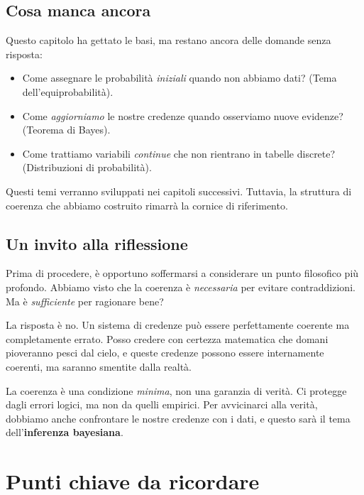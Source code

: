 \documentclass[
  italian,
  letterpaper,
  a4paper,
  11pt,
  open=any]{scrbook}
\providecommand{\tightlist}{%
  \setlength{\itemsep}{0pt}\setlength{\parskip}{0pt}}
\theoremstyle{plain}
\theoremstyle{definition}
\theoremstyle{definition}
\theoremstyle{remark}
\begin{document}
\subsection{Cosa manca ancora}\label{cosa-manca-ancora}

Questo capitolo ha gettato le basi, ma restano ancora delle domande
senza risposta:

\begin{itemize}
\tightlist
\item
  Come assegnare le probabilità \emph{iniziali} quando non abbiamo dati?
  (Tema dell'equiprobabilità).
\item
  Come \emph{aggiorniamo} le nostre credenze quando osserviamo nuove
  evidenze? (Teorema di Bayes).
\item
  Come trattiamo variabili \emph{continue} che non rientrano in tabelle
  discrete? (Distribuzioni di probabilità).
\end{itemize}

Questi temi verranno sviluppati nei capitoli successivi. Tuttavia, la
struttura di coerenza che abbiamo costruito rimarrà la cornice di
riferimento.

\subsection{Un invito alla
riflessione}\label{un-invito-alla-riflessione}

Prima di procedere, è opportuno soffermarsi a considerare un punto
filosofico più profondo. Abbiamo visto che la coerenza è
\emph{necessaria} per evitare contraddizioni. Ma è \emph{sufficiente}
per ragionare bene?

La risposta è no. Un sistema di credenze può essere perfettamente
coerente ma completamente errato. Posso credere con certezza matematica
che domani pioveranno pesci dal cielo, e queste credenze possono essere
internamente coerenti, ma saranno smentite dalla realtà.

La coerenza è una condizione \emph{minima}, non una garanzia di verità.
Ci protegge dagli errori logici, ma non da quelli empirici. Per
avvicinarci alla verità, dobbiamo anche confrontare le nostre credenze
con i dati, e questo sarà il tema dell'\textbf{inferenza bayesiana}.

\section*{Punti chiave da ricordare}\label{punti-chiave-da-ricordare-1}
\end{document}
